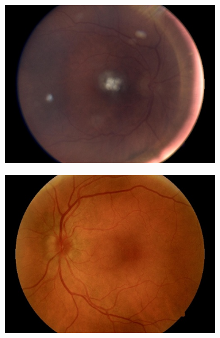 \documentclass[12pt]{article}
\begin{document}
\begin{figure}
    \centering
    \begin{subfigure}[b]{0.47\textwidth}
        \centering
        \includegraphics[width=\textwidth]{images/no_box/TRAIN000883_boxes.jpg}
        \label{fig:images_no_box_1}
    \end{subfigure}
    \hfill
    \begin{subfigure}[b]{0.47\textwidth}
        \centering
        \includegraphics[width=\textwidth]{images/no_box/TRAIN045856_boxes.jpg}
        \label{fig:images_no_box_2}
    \end{subfigure}
    \break
    \begin{subfigure}[b]{0.47\textwidth}
        \centering

\end{subfigure}
\end{figure}
\end{document}
